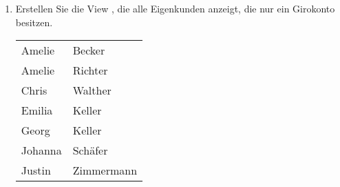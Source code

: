 \begin{enumerate}
        \item Erstellen Sie die View , die alle Eigenkunden anzeigt, die nur ein Girokonto besitzen.
        \begin{center}
          \begin{small}
            \tablehead{}
            \tabletail {
            }
            \begin{msoraclesql}
              \begin{supertabular}{ll}
                Amelie & Becker \\
                Amelie & Richter \\
                Chris & Walther \\
                Emilia & Keller \\
                Georg & Keller \\
                Johanna & Schäfer \\
                Justin & Zimmermann \\
              \end{supertabular}
            \end{msoraclesql}
          \end{small}
        \end{center}
      \end{enumerate}
